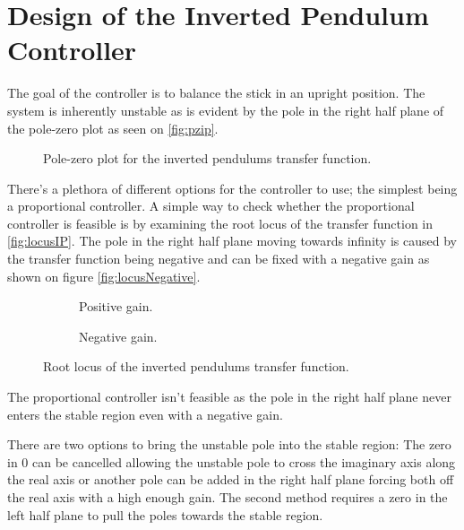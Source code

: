 \graphicspath{{figures/Design/IPController/}}
\chapter{Design of the Inverted Pendulum Controller}\label{sec:IPController}
The goal of the controller is to balance the stick in an upright position. 
The system is inherently unstable as is evident by the pole in the right half plane of the pole-zero plot as seen on \autoref{fig:pzip}.

\begin{figure}[htbp]
\centering
\missingfigure{}
\caption{Pole-zero plot for the inverted pendulums transfer function.}
\label{fig:pzip}
\end{figure}

There's a plethora of different options for the controller to use; the simplest being a proportional controller. A simple way to check whether the proportional controller is feasible is by examining the root locus of the transfer function in \autoref{fig:locusIP}. The pole in the right half plane moving towards infinity is caused by the transfer function being negative and can be fixed with a negative gain as shown on figure \autoref{fig:locusNegative}.

\begin{figure}[htbp]
\centering
	\begin{subfigure}{0.45\textwidth}
	\missingfigure{}
	\caption{Positive gain.}
	\label{fig:locusIP}
	\end{subfigure}
	\begin{subfigure}{0.45\textwidth}
	\centering
	\missingfigure{}
	\caption{Negative gain.}
	\label{fig:locusNegative}
	\end{subfigure}
\caption{Root locus of the inverted pendulums transfer function.}
\end{figure}

The proportional controller isn't feasible as the pole in the right half plane never enters the stable region even with a negative gain.

There are two options to bring the unstable pole into the stable region: The zero in 0 can be cancelled allowing the unstable pole to cross the imaginary axis along the real axis or another pole can be added in the right half plane forcing both off the real axis with a high enough gain. The second method requires a zero in the left half plane to pull the poles towards the stable region.

